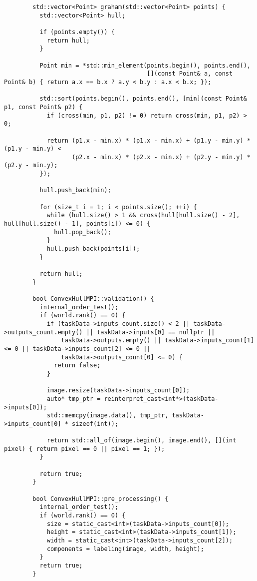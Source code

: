 \documentclass{report}
\begin{document}
\begin{lstlisting}
        std::vector<Point> graham(std::vector<Point> points) {
          std::vector<Point> hull;
        
          if (points.empty()) {
            return hull;
          }
        
          Point min = *std::min_element(points.begin(), points.end(),
                                        [](const Point& a, const Point& b) { return a.x == b.x ? a.y < b.y : a.x < b.x; });
        
          std::sort(points.begin(), points.end(), [min](const Point& p1, const Point& p2) {
            if (cross(min, p1, p2) != 0) return cross(min, p1, p2) > 0;
        
            return (p1.x - min.x) * (p1.x - min.x) + (p1.y - min.y) * (p1.y - min.y) <
                   (p2.x - min.x) * (p2.x - min.x) + (p2.y - min.y) * (p2.y - min.y);
          });
        
          hull.push_back(min);
        
          for (size_t i = 1; i < points.size(); ++i) {
            while (hull.size() > 1 && cross(hull[hull.size() - 2], hull[hull.size() - 1], points[i]) <= 0) {
              hull.pop_back();
            }
            hull.push_back(points[i]);
          }
        
          return hull;
        }
        
        bool ConvexHullMPI::validation() {
          internal_order_test();
          if (world.rank() == 0) {
            if (taskData->inputs_count.size() < 2 || taskData->outputs_count.empty() || taskData->inputs[0] == nullptr ||
                taskData->outputs.empty() || taskData->inputs_count[1] <= 0 || taskData->inputs_count[2] <= 0 ||
                taskData->outputs_count[0] <= 0) {
              return false;
            }
        
            image.resize(taskData->inputs_count[0]);
            auto* tmp_ptr = reinterpret_cast<int*>(taskData->inputs[0]);
            std::memcpy(image.data(), tmp_ptr, taskData->inputs_count[0] * sizeof(int));
        
            return std::all_of(image.begin(), image.end(), [](int pixel) { return pixel == 0 || pixel == 1; });
          }
        
          return true;
        }
        
        bool ConvexHullMPI::pre_processing() {
          internal_order_test();
          if (world.rank() == 0) {
            size = static_cast<int>(taskData->inputs_count[0]);
            height = static_cast<int>(taskData->inputs_count[1]);
            width = static_cast<int>(taskData->inputs_count[2]);
            components = labeling(image, width, height);
          }
          return true;
        }
        

\end{lstlisting}
\end{document}
